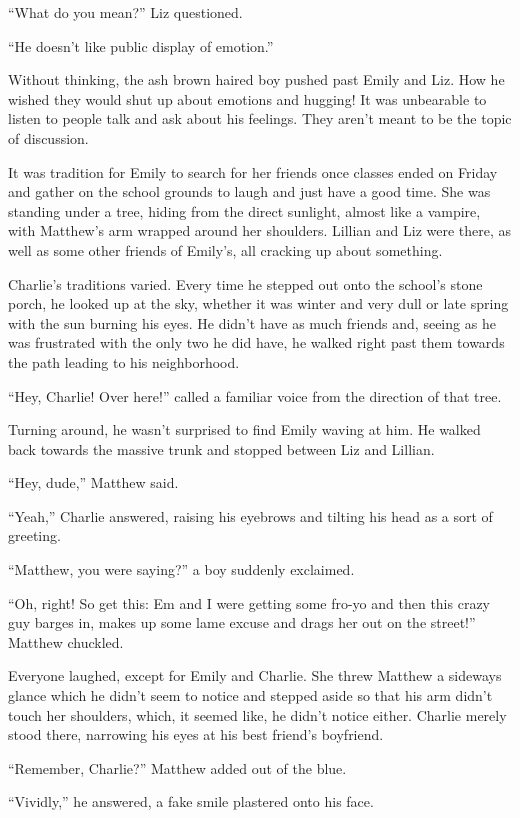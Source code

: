 “What do you mean?” Liz questioned.

“He doesn’t like public display of emotion.”

Without thinking, the ash brown haired boy pushed past Emily and Liz. How he wished they would shut up about emotions and hugging! It was unbearable to listen to people talk and ask about his feelings. They aren’t meant to be the topic of discussion.

\bigskip

It was tradition for Emily to search for her friends once classes ended on Friday and gather on the school grounds to laugh and just have a good time. She was standing under a tree, hiding from the direct sunlight, almost like a vampire, with Matthew’s arm wrapped around her shoulders. Lillian and Liz were there, as well as some other friends of Emily’s, all cracking up about something.

Charlie’s traditions varied. Every time he stepped out onto the school’s stone porch, he looked up at the sky, whether it was winter and very dull or late spring with the sun burning his eyes. He didn’t have as much friends and, seeing as he was frustrated with the only two he did have, he walked right past them towards the path leading to his neighborhood.

“Hey, Charlie! Over here!” called a familiar voice from the direction of that tree.

Turning around, he wasn’t surprised to find Emily waving at him. He walked back towards the massive trunk and stopped between Liz and Lillian.

“Hey, dude,” Matthew said.

“Yeah,” Charlie answered, raising his eyebrows and tilting his head as a sort of greeting.

“Matthew, you were saying?” a boy suddenly exclaimed.

“Oh, right! So get this: Em and I were getting some fro-yo and then this crazy guy barges in, makes up some lame excuse and drags her out on the street!” Matthew chuckled.

Everyone laughed, except for Emily and Charlie. She threw Matthew a sideways glance which he didn’t seem to notice and stepped aside so that his arm didn’t touch her shoulders, which, it seemed like, he didn’t notice either. Charlie merely stood there, narrowing his eyes at his best friend’s boyfriend.

“Remember, Charlie?” Matthew added out of the blue.

“Vividly,” he answered, a fake smile plastered onto his face.

